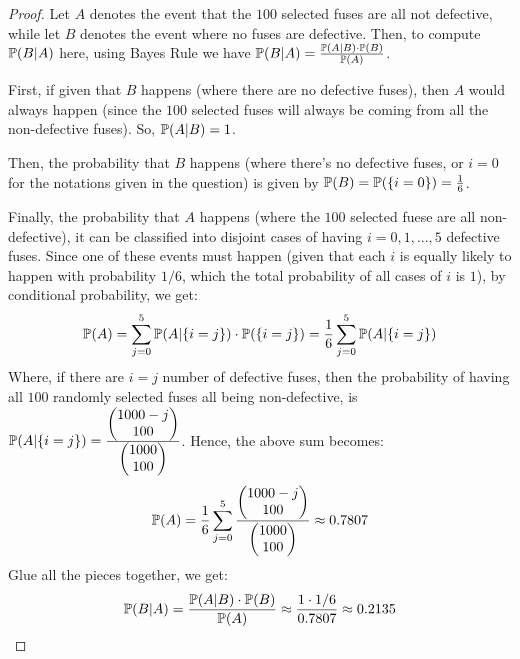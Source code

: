\documentclass{article}
\begin{document}
\begin{proof}
    Let $A$ denotes the event that the $100$ selected fuses are all not defective, while let $B$ denotes the event where no fuses are defective. Then, to compute $\mathbb{P}(B|A)$ here, using Bayes Rule we have $\mathbb{P}(B|A)=\frac{\mathbb{P}(A|B)\cdot\mathbb{P}(B)}{\mathbb{P}(A)}$.

    First, if given that $B$ happens (where there are no defective fuses), then $A$ would always happen (since the $100$ selected fuses will always be coming from all the non-defective fuses). So, $\mathbb{P}(A|B)=1$.

    Then, the probability that $B$ happens (where there's no defective fuses, or $i=0$ for the notations given in the question) is given by $\mathbb{P}(B)=\mathbb{P}(\{i=0\}) = \frac{1}{6}$.

    Finally, the probability that $A$ happens (where the $100$ selected fuese are all non-defective), it can be classified into disjoint cases of having $i=0,1,...,5$ defective fuses. Since one of these events must happen (given that each $i$ is equally likely to happen with probability $1/6$, which the total probability of all cases of $i$ is $1$), by conditional probability, we get:
    \begin{align}
        \mathbb{P}(A)=\sum_{j=0}^{5}\mathbb{P}(A|\{i=j\})\cdot\mathbb{P}(\{i=j\}) = \frac{1}{6}\sum_{j=0}^{5}\mathbb{P}(A|\{i=j\})
    \end{align}
    Where, if there are $i=j$ number of defective fuses, then the probability of having all $100$ randomly selected fuses all being non-defective, is $\mathbb{P}(A|\{i=j\})=\frac{\begin{pmatrix}1000-j\\100\end{pmatrix}}{\begin{pmatrix}1000\\100\end{pmatrix}}$. Hence, the above sum becomes:
    \begin{align}
        \mathbb{P}(A)=\frac{1}{6}\sum_{j=0}^{5}\frac{\begin{pmatrix}1000-j\\100\end{pmatrix}}{\begin{pmatrix}1000\\100\end{pmatrix}} \approx 0.7807
    \end{align}
    Glue all the pieces together, we get:
    \begin{align}
        \mathbb{P}(B|A)=\frac{\mathbb{P}(A|B)\cdot\mathbb{P}(B)}{\mathbb{P}(A)} \approx \frac{1\cdot 1/6}{0.7807}\approx 0.2135
    \end{align}
\end{proof}
\end{document}
